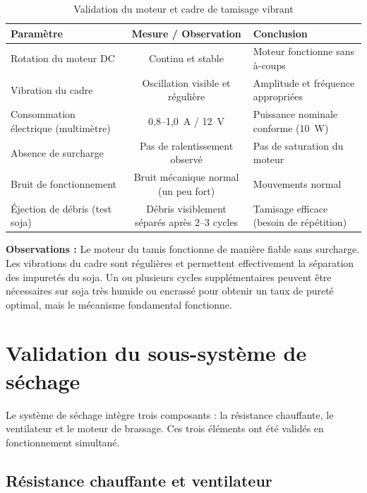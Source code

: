 \begin{table}[H]
    \caption{Validation du moteur et cadre de tamisage vibrant}
    \label{tab:validation_tamisage}
    \centering
\small
\renewcommand{\arraystretch}{1.5}
\begin{tabularx}{\textwidth}{|L|C|L|}
\hline
{}
\textbf{Paramètre} & \textbf{Mesure / Observation} & \textbf{Conclusion} \\ \hline
Rotation du moteur DC & Continu et stable & Moteur fonctionne sans à-coups \\ \hline
Vibration du cadre & Oscillation visible et régulière & Amplitude et fréquence appropriées \\ \hline
Consommation électrique (multimètre) & 0,8--1,0~A / 12~V & Puissance nominale conforme (10~W) \\ \hline
Absence de surcharge & Pas de ralentissement observé & Pas de saturation du moteur \\ \hline
Bruit de fonctionnement & Bruit mécanique normal (un peu fort) & Mouvements normal \\ \hline
Éjection de débris (test soja) & Débris visiblement séparés après 2--3 cycles & Tamisage efficace (besoin de répétition) \\ \hline
\end{tabularx}
\end{table}

\textbf{Observations :} Le moteur du tamis fonctionne de manière fiable sans surcharge. Les vibrations du cadre sont régulières et permettent effectivement la séparation des impuretés du soja. Un ou plusieurs cycles supplémentaires peuvent être nécessaires sur soja très humide ou encrassé pour obtenir un taux de pureté optimal, mais le mécanisme fondamental fonctionne.

\section{Validation du sous-système de séchage}

Le système de séchage intègre trois composants : la résistance chauffante, le ventilateur et le moteur de brassage. Ces trois éléments ont été validés en fonctionnement simultané.

\subsection{Résistance chauffante et ventilateur}

